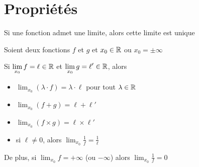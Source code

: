 \section{Propriétés}

\begin{frame}
\begin{proposition}
Si une fonction admet une limite, alors cette limite est unique
\end{proposition}

\end{frame}


\begin{frame}

Soient deux fonctions $f$ et $g$ et $x_0\in\mathbb{R}$ ou $x_0=\pm\infty$
 
\pause 

\begin{proposition}
Si $\displaystyle\lim_{x_0} f=\ell\in\mathbb{R}$ et $\displaystyle\lim_{x_0} g=\ell'\in\mathbb{R}$,  alors 
\pause
\begin{itemize}
  \item $\displaystyle\lim_{x_0} (\lambda\cdot f)=\lambda\cdot \ell$ \quad pour tout $\lambda\in\mathbb{R}$ 
   
\pause 
  \item $\displaystyle\lim_{x_0} (f+g) = \ell+\ell'$ 
  
\pause   
  \item $\displaystyle\lim_{x_0} (f\times g) = \ell\times \ell'$ 
   
\pause 
  \item si $\ell\neq 0$, alors $\displaystyle\lim_{x_0} \frac1f = \frac1\ell$
\end{itemize}
 
\pause 
De plus, si $\displaystyle\lim_{x_0} f=+\infty$ (ou $-\infty$) alors $\displaystyle\lim_{x_0} \frac1f = 0$
\end{proposition}

\end{frame}



